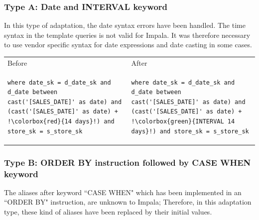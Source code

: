 \documentclass{article}
\begin{document}
\subsubsection{Type A: Date and INTERVAL keyword} 
In this type of adaptation, the date syntax errors have been handled. The time syntax in the template queries is not valid for Impala. It was therefore necessary to use vendor specific syntax for date expressions and date casting in some cases. 

\begin{tabular}{p{8cm}|p{8cm}}

\hspace{3cm} Before & \hspace{3cm} After \\

\begin{lstlisting}[frame=none, escapechar=!]
where date_sk = d_date_sk and d_date between cast('[SALES_DATE]' as date) and (cast('[SALES_DATE]' as date) +  !\colorbox{red}{14 days}!) and store_sk = s_store_sk
\end{lstlisting}

&

\begin{lstlisting}[frame=none, escapechar=!]
where date_sk = d_date_sk and d_date between cast('[SALES_DATE]' as date) and (cast('[SALES_DATE]' as date) +  !\colorbox{green}{INTERVAL 14 days}!) and store_sk = s_store_sk
\end{lstlisting} 

\end{tabular}

\subsubsection{Type B: ORDER BY instruction followed by CASE WHEN keyword}

The aliases after keyword ``CASE WHEN" which has been implemented in an ``ORDER BY" instruction, are unknown to Impala; Therefore, in this adaptation type, these kind of aliases have been replaced by their initial values.
\end{document}
